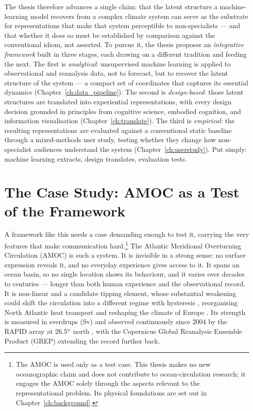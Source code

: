 The thesis therefore advances a single claim: that the latent structure a machine-learning model recovers from a complex climate system can serve as the substrate for representations that make that system perceptible to non-specialists --- and that whether it does so must be established by comparison against the conventional idiom, not asserted. To pursue it, the thesis proposes an \emph{integrative framework} built in three stages, each drawing on a different tradition and feeding the next. The first is \emph{analytical}: unsupervised machine learning is applied to observational and reanalysis data, not to forecast, but to recover the latent structure of the system --- a compact set of coordinates that captures its essential dynamics (Chapter~\ref{ch:data_pipeline}). The second is \emph{design-based}: those latent structures are translated into experiential representations, with every design decision grounded in principles from cognitive science, embodied cognition, and information visualisation (Chapter~\ref{ch:translate}). The third is \emph{empirical}: the resulting representations are evaluated against a conventional static baseline through a mixed-methods user study, testing whether they change how non-specialist audiences understand the system (Chapter~\ref{ch:userstudy}). Put simply: machine learning extracts, design translates, evaluation tests.
\section{The Case Study: AMOC as a Test of the Framework}
\label{sec:case-study-amoc}

A framework like this needs a case demanding enough to test it, carrying the very features that make communication hard.\footnote{The AMOC is used only as a test case. This thesis makes no new oceanographic claim and does not contribute to ocean-circulation research; it engages the AMOC solely through the aspects relevant to the representational problem. Its physical foundations are set out in Chapter~\ref{ch:background}.} The Atlantic Meridional Overturning Circulation (AMOC) is such a system. It is invisible in a strong sense: no surface expression reveals it, and no everyday experience gives access to it. It spans an ocean basin, so no single location shows its behaviour, and it varies over decades to centuries --- longer than both human experience and the observational record. It is non-linear and a candidate tipping element, whose substantial weakening could shift the circulation into a different regime with hysteresis \citep{armstrongmckay2022, lenton2008}, reorganising North Atlantic heat transport and reshaping the climate of Europe \citep{buckley2016}. Its strength is measured in sverdrups (Sv) and observed continuously since 2004 by the RAPID array at \ang{26.5}~north \citep{frajkawilliams2021, moat2026}, with the Copernicus Global Reanalysis Ensemble Product (GREP) extending the record further back.
 
